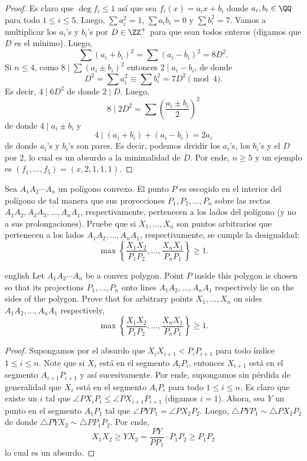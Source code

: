 \begin{proof}
  Es claro que $\deg{f_i}\le 1$ así que sea $f_i(x)=a_ix+b_i$ donde
  $a_i,b_i\in\QQ$ para todo $1\le i\le 5$. Luego, $\sum a_i^2=1$,
  $\sum a_ib_i=0$ y $\sum b_i^2=7$. Vamos a multiplicar los $a_i$'s y $b_i$'s
  por $D\in\ZZ^+$ para que sean todos enteros (digamos que $D$ es el mínimo).
  Luego,
  \[\sum(a_i+b_i)^2=\sum(a_i-b_i)^2=8D^2.\]
  Si $n\le 4$, como $8\mid\sum(a_i\pm b_i)^2$ entonces $2\mid a_i-b_i$, de donde
  \[D^2=\sum a_i^2\equiv\sum b_i^2=7D^2\pmod 4.\]
  Es decir, $4\mid 6D^2$ de donde $2\mid D$. Luego,
  \[8\mid 2D^2=\sum\left(\frac{a_i\pm b_i}{2}\right)^2\]
  de donde $4\mid a_i\pm b_i$ y
  \[4\mid(a_i+b_i)+(a_i-b_i)=2a_i\]
  de donde $a_i$'s y $b_i$'s son pares. Es decir, podemos dividir los $a_i$'s,
  los $b_i$'s y el $D$ por $2$, lo cual es un absurdo a la minimalidad de $D$.
  Por ende, $n\ge 5$ y un ejemplo es $(f_1,\dots,f_5)=(x,2,1,1,1)$.
\end{proof}

\begin{probEG}
  Sea $A_1A_2\cdots A_n$ un polígono convexo. El punto $P$ es escogido en el
  interior del polígono de tal manera que sus proyecciones $P_1,P_2,\dots,P_n$
  sobre las rectas $A_1A_2,A_2A_3,\dots,A_nA_1$, respectivamente, pertenecen a
  los lados del polígono (y no a sus prolongaciones). Pruebe que si
  $X_1,\dots,X_n$ son puntos arbitrarios que pertenecen a los lados
  $A_1A_2,\dots,A_nA_1$, respectivamente, se cumple la desigualdad:
  \[
    \max\left\{\frac{X_1X_2}{P_1P_2},\dots,\frac{X_nX_1}{P_nP_1}\right\}
    \ge 1.
  \]
  \begin{hint}
    \begin{otherlanguage*}{english}
      Let $A_1A_2\cdots A_n$ be a convex polygon. Point $P$ inside this polygon
      is chosen so that its projections $P_1,\dots,P_n$ onto lines
      $A_1A_2,\dots,A_nA_1$ respectively lie on the sides of the polygon. Prove
      that for arbitrary points $X_1,\dots,X_n$ on sides $A_1A_2,\dots,A_nA_1$
      respectively,
      \[
        \max\left\{\frac{X_1X_2}{P_1P_2},\dots,\frac{X_nX_1}{P_nP_1}\right\}
        \ge 1.
      \]
    \end{otherlanguage*}
  \end{hint}
\end{probEG}

\begin{proof}
  Supongamos por el absurdo que $X_iX_{i+1}<P_iP_{i+1}$ para todo índice
  $1\le i\le n$. Note que si $X_i$ está en el segmento $A_iP_i$, entonces
  $X_{i+1}$ está en el segmento $A_{i+1}P_{i+1}$ y así sucesivamente. Por ende,
  supongamos sin pérdida de generalidad que $X_i$ está en el segmento $A_iP_i$
  para todo $1\le i\le n$. Es claro que existe un $i$ tal que
  $\angle PX_iP_i\le\angle PX_{i+1}P_{i+1}$ (digamos $i=1$). Ahora, sea $Y$ un
  punto en el segmento $A_1P_1$ tal que $\angle PYP_1=\angle PX_2P_2$. Luego,
  $\triangle PYP_1\sim\triangle PX_2P_2$ de donde
  $\triangle PYX_2\sim\triangle PP_1P_2$. Por ende,
  \[X_1X_2\ge YX_2=\frac{PY}{PP_1}\cdot P_1P_2\ge P_1P_2\]
  lo cual es un absurdo.
\end{proof}

